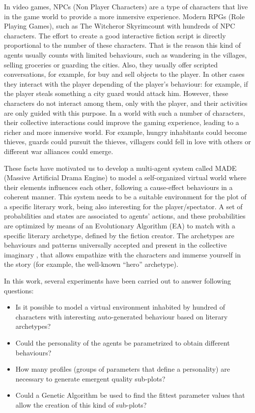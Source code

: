 \documentclass[runningheads]{llncs}
\begin{document}
In video games, NPCs (Non Player Characters) are a type of characters that live in the game world to provide a more inmersive experience. Modern RPGs (Role Playing Games), such as The Witcher\texttrademark or Skyrim\texttrademark count with hundreds of NPC characters. The effort to create a good interactive fiction script is directly proportional to the number of these characters. That is the reason this kind of agents usually counts with limited behaviours, such as wandering in the villages, selling groceries or guarding the cities. Also, they usually offer scripted conversations, for example, for buy and sell objects to the player. In other cases they interact with the player depending of the player's behaviour: for example, if the player steals something a city guard would attack him.  However, these characters do not interact among them, only with the player, and their activities are only guided with this purpose. In a world with such a number of characters, their collective interactions could improve the gaming experience, leading to a richer and more inmersive world. For example, hungry inhabitants could become thieves, guards could pursuit the thieves, villagers could fell in love with others or different war alliances could emerge.

These facts have motivated us to develop a multi-agent system called MADE (Massive Artificial Drama Engine) to model a self-organized virtual world where their elements influences each other, following a cause-effect behaviours in a coherent manner. This system needs to be a suitable environment for the plot of a specific literary work, being also interesting for the player/spectator. A set of probabilities and states are associated to agents' actions, and these probabilities are optimized by means of an Evolutionary Algorithm (EA) to match with a specific literary archetype, defined by the fiction creator. The archetypes are behaviours and patterns universally accepted and present in the collective imaginary \cite{ArchetypesGarry05}, that allows empathize with the characters and immerse yourself in the story (for example, the well-known ``hero'' archetype).

In this work, several experiments have been carried out to answer following questions: 


\begin{itemize}
 \item Is it possible to model a virtual environment inhabited by hundred of characters with interesting auto-generated behaviour based on literary archetypes?
 \item Could the personality of the agents be parametrized to obtain different behaviours? 
 \item How many profiles (groups of parameters that define a personality) are necessary to generate emergent quality sub-plots?
 \item Could a Genetic Algorithm be used to find the fittest parameter values that allow the creation of this kind of sub-plots?
\end{itemize}
\end{document}

